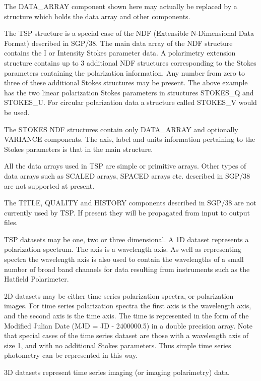 The DATA\_ARRAY component shown here may actually be replaced by a structure
which holds the data array and other components.

The TSP structure is a special case of the NDF (Extensible N-Dimensional
Data Format) described in SGP/38. The main data array of the NDF structure
contains the I or Intensity Stokes parameter data. A polarimetry extension
structure contains up to 3 additional NDF structures corresponding to the
Stokes parameters containing the polarization information. Any number from
zero to three of these additional Stokes structures may be present. The
above example has the two linear polarization Stokes parameters in structures
STOKES\_Q and STOKES\_U. For circular polarization data
a structure called STOKES\_V would be used.

The STOKES NDF structures contain only DATA\_ARRAY and optionally VARIANCE
components. The axis, label and units information pertaining to the Stokes
parameters is that in the main structure.

All the data arrays used in TSP are simple or primitive arrays. Other types
of data arrays such as SCALED arrays, SPACED arrays etc. described in SGP/38
are not supported at present.                                   
                                                         
The TITLE, QUALITY and HISTORY components described in SGP/38 are not
currently used by TSP. If present they will be propagated from input to
output files.

TSP datasets may be one, two or three dimensional. A 1D dataset represents
a polarization spectrum. The axis is a wavelength axis. As well as representing
spectra the wavelength axis is also used to contain the wavelengths of a
small number of broad band channels for data resulting from instruments
such as the Hatfield Polarimeter.

2D datasets may be either time series polarization spectra, or polarization images. For time series polarization spectra the first axis
is the wavelength axis, and the second axis is the time axis. The time is
represented in the form of the Modified Julian Date (MJD = JD - 2400000.5)
in a double precision array. Note that special cases of the time series
dataset are those with a wavelength axis of size 1, and with no additional
Stokes parameters. Thus simple time series photometry can be represented   
in this way. 

3D datasets represent time series imaging (or imaging polarimetry) data.

